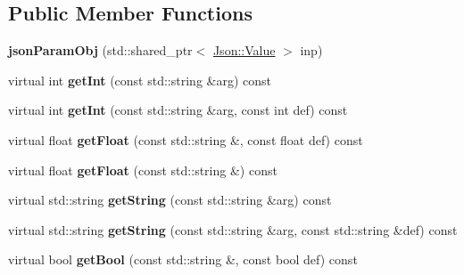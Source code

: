 \subsection*{Public Member Functions}
\begin{DoxyCompactItemize}
\item 
\mbox{\label{class_s_e_p_1_1json_param_obj_a044aa5c3fd3ffff93be00dc73ee7055e}} 
{\bfseries json\+Param\+Obj} (std\+::shared\+\_\+ptr$<$ \hyperlink{class_json_1_1_value}{Json\+::\+Value} $>$ inp)
\item 
\mbox{\label{class_s_e_p_1_1json_param_obj_a1f55fd26629c7d3b28b4379f9efb294e}} 
virtual int {\bfseries get\+Int} (const std\+::string \&arg) const
\item 
\mbox{\label{class_s_e_p_1_1json_param_obj_a4ba669ad1b3cd59188f887872bf27378}} 
virtual int {\bfseries get\+Int} (const std\+::string \&arg, const int def) const
\item 
\mbox{\label{class_s_e_p_1_1json_param_obj_ad4a67c1fe0b2667cfdbbf59181c023f0}} 
virtual float {\bfseries get\+Float} (const std\+::string \&, const float def) const
\item 
\mbox{\label{class_s_e_p_1_1json_param_obj_aa3abcfbaea46949c027cc891667d04d2}} 
virtual float {\bfseries get\+Float} (const std\+::string \&) const
\item 
\mbox{\label{class_s_e_p_1_1json_param_obj_afddc62a9f54902e8366205864f39d927}} 
virtual std\+::string {\bfseries get\+String} (const std\+::string \&arg) const
\item 
\mbox{\label{class_s_e_p_1_1json_param_obj_a050d3a9d7e6154bbdef8b388737a1148}} 
virtual std\+::string {\bfseries get\+String} (const std\+::string \&arg, const std\+::string \&def) const
\item 
\mbox{\label{class_s_e_p_1_1json_param_obj_a51070ba3311e2d7feecfad1cd6f2dafd}} 
virtual bool {\bfseries get\+Bool} (const std\+::string \&, const bool def) const
\item 

\end{DoxyCompactItemize}
